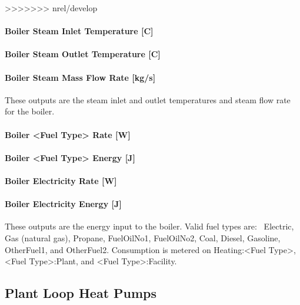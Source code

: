 >>>>>>> nrel/develop
\paragraph{Boiler Steam Inlet Temperature {[}C{]}}\label{boiler-steam-inlet-temperature-c}

\paragraph{Boiler Steam Outlet Temperature {[}C{]}}\label{boiler-steam-outlet-temperature-c}

\paragraph{Boiler Steam Mass Flow Rate {[}kg/s{]}}\label{boiler-steam-mass-flow-rate-kgs}

These outputs are the steam inlet and outlet temperatures and steam flow rate for the boiler.

\paragraph{Boiler \textless{}Fuel Type\textgreater{} Rate {[}W{]}}\label{boiler-fuel-type-rate-w-1}

\paragraph{Boiler \textless{}Fuel Type\textgreater{} Energy {[}J{]}}\label{boiler-fuel-type-energy-j-1}

\paragraph{Boiler Electricity Rate {[}W{]}}\label{boiler-electric-power-w-1}

\paragraph{Boiler Electricity Energy {[}J{]}}\label{boiler-electric-energy-j}

These outputs are the energy input to the boiler. Valid fuel types are:~ Electric, Gas (natural gas), Propane, FuelOilNo1, FuelOilNo2, Coal, Diesel, Gasoline, OtherFuel1, and OtherFuel2. Consumption is metered on Heating:\textless{}Fuel Type\textgreater{}, \textless{}Fuel Type\textgreater{}:Plant, and \textless{}Fuel Type\textgreater{}:Facility.

\subsection{Plant Loop Heat Pumps}\label{plant-loop-heat-pumps}

